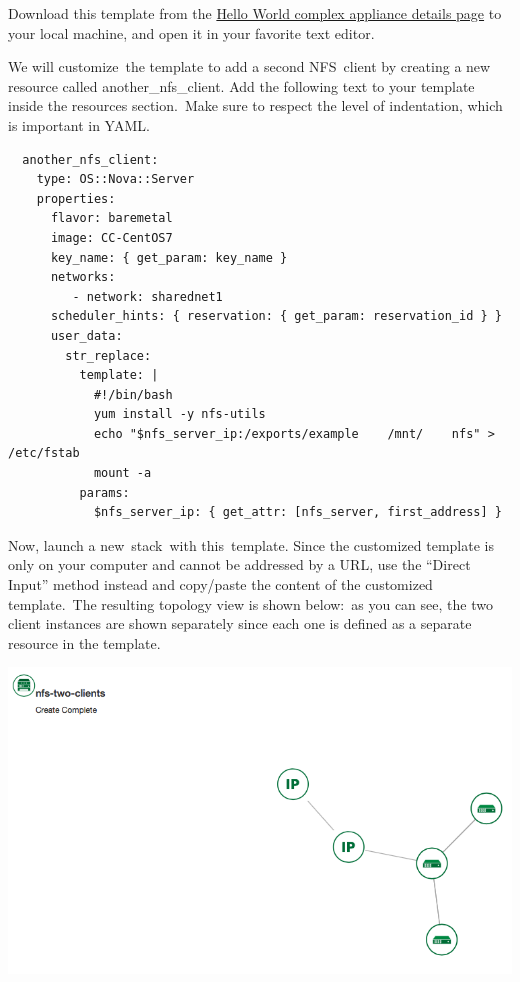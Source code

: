 Download this template from the
\href{https://www.chameleoncloud.org/appliances/26/}{Hello World complex
appliance details page} to your local machine, and open it in your
favorite text editor.

We will customize~the template to add a second NFS~client by creating a
new resource called another\_nfs\_client. Add the following text to your
template inside the resources section.~Make sure to respect the level of
indentation, which is important in YAML.

\begin{footnotesize}
\begin{verbatim}
  another_nfs_client:
    type: OS::Nova::Server
    properties:
      flavor: baremetal
      image: CC-CentOS7
      key_name: { get_param: key_name }
      networks:
         - network: sharednet1
      scheduler_hints: { reservation: { get_param: reservation_id } }
      user_data:
        str_replace:
          template: |
            #!/bin/bash
            yum install -y nfs-utils
            echo "$nfs_server_ip:/exports/example    /mnt/    nfs" > /etc/fstab
            mount -a
          params:
            $nfs_server_ip: { get_attr: [nfs_server, first_address] }
\end{verbatim}
\end{footnotesize}

Now, launch a new~stack~with this~template. Since the customized
template is only on your computer and cannot be addressed by a URL, use
the ``Direct Input'' method instead and copy/paste the content of the
customized template.~The resulting topology view is shown below:~as you
can see, the two client instances are shown separately since each one is
defined as a separate resource in the template.

\includegraphics[width=\columnwidth]{images/chameleon/NFS-Two-Clients_lFGgizN.png}

